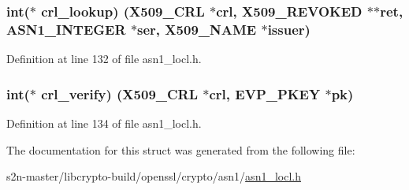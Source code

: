 \subsubsection[{\texorpdfstring{crl\+\_\+lookup}{crl_lookup}}]{\setlength{\rightskip}{0pt plus 5cm}int($\ast$ crl\+\_\+lookup) ({\bf X509\+\_\+\+C\+RL} $\ast$crl, {\bf X509\+\_\+\+R\+E\+V\+O\+K\+ED} $\ast$$\ast$ret, {\bf A\+S\+N1\+\_\+\+I\+N\+T\+E\+G\+ER} $\ast$ser, {\bf X509\+\_\+\+N\+A\+ME} $\ast$issuer)}\hypertarget{structx509__crl__method__st_a09f09b17b8e24b9d14fae92c904d0c55}{}\label{structx509__crl__method__st_a09f09b17b8e24b9d14fae92c904d0c55}


Definition at line 132 of file asn1\+\_\+locl.\+h.

\subsubsection[{\texorpdfstring{crl\+\_\+verify}{crl_verify}}]{\setlength{\rightskip}{0pt plus 5cm}int($\ast$ crl\+\_\+verify) ({\bf X509\+\_\+\+C\+RL} $\ast$crl, {\bf E\+V\+P\+\_\+\+P\+K\+EY} $\ast$pk)}\hypertarget{structx509__crl__method__st_ade102d65cd078d3fe83307c02f142670}{}\label{structx509__crl__method__st_ade102d65cd078d3fe83307c02f142670}


Definition at line 134 of file asn1\+\_\+locl.\+h.



The documentation for this struct was generated from the following file\+:\begin{DoxyCompactItemize}
\item 
s2n-\/master/libcrypto-\/build/openssl/crypto/asn1/\hyperlink{asn1__locl_8h}{asn1\+\_\+locl.\+h}\end{DoxyCompactItemize}
